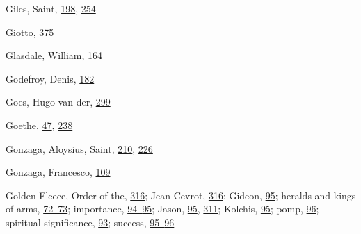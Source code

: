 Giles, Saint,
\protect\hyperlink{13_Chapter_Six__THE_DEPICTION_OF_TH.xhtmlux5cux23page_198}{198},
\protect\hyperlink{17_Chapter_Ten__THE_FAILURE_OF_IMAG.xhtmlux5cux23page_254}{254}

Giotto,
\protect\hyperlink{21_Chapter_Thirteen__IMAGE_AND_WORD.xhtmlux5cux23page_375}{375}

Glasdale, William,
\protect\hyperlink{12_Chapter_Five__THE_VISION_OF_DEAT.xhtmlux5cux23page_164}{164}

Godefroy, Denis,
\protect\hyperlink{13_Chapter_Six__THE_DEPICTION_OF_TH.xhtmlux5cux23page_182}{182}

Goes, Hugo van der,
\protect\hyperlink{20_ILLUSTRATIONS_FOLLOW_PAGE.xhtmlux5cux23page_299}{299}

Goethe,
\protect\hyperlink{09_Chapter_Two__THE_CRAVING_FOR_A_M.xhtmlux5cux23page_47}{47},
\protect\hyperlink{16_Chapter_Nine__THE_DECLINE_OF_SYM.xhtmlux5cux23page_238}{238}

Gonzaga, Aloysius, Saint,
\protect\hyperlink{14_Chapter_Seven__THE_PIOUS_PERSONA.xhtmlux5cux23page_210}{210},
\protect\hyperlink{15_Chapter_Eight__RELIGIOUS_EXCITAT.xhtmlux5cux23page_226}{226}

Gonzaga, Francesco,
\protect\hyperlink{10_Chapter_Three__THE_HEROIC_DREAM.xhtmlux5cux23page_109}{109}

Golden Fleece, Order of the,
\protect\hyperlink{20_ILLUSTRATIONS_FOLLOW_PAGE.xhtmlux5cux23page_316}{316};
Jean Cevrot,
\protect\hyperlink{20_ILLUSTRATIONS_FOLLOW_PAGE.xhtmlux5cux23page_316}{316};
Gideon,
\protect\hyperlink{10_Chapter_Three__THE_HEROIC_DREAM.xhtmlux5cux23page_95}{95};
heralds and kings of arms,
\protect\hyperlink{10_Chapter_Three__THE_HEROIC_DREAM.xhtmlux5cux23page_72}{72--}\protect\hyperlink{10_Chapter_Three__THE_HEROIC_DREAM.xhtmlux5cux23page_73}{73};
importance,
\protect\hyperlink{10_Chapter_Three__THE_HEROIC_DREAM.xhtmlux5cux23page_94}{94--}\protect\hyperlink{10_Chapter_Three__THE_HEROIC_DREAM.xhtmlux5cux23page_95}{95};
Jason,
\protect\hyperlink{10_Chapter_Three__THE_HEROIC_DREAM.xhtmlux5cux23page_95}{95},
\protect\hyperlink{20_ILLUSTRATIONS_FOLLOW_PAGE.xhtmlux5cux23page_311}{311};
Kolchis,
\protect\hyperlink{10_Chapter_Three__THE_HEROIC_DREAM.xhtmlux5cux23page_95}{95};
pomp,
\protect\hyperlink{10_Chapter_Three__THE_HEROIC_DREAM.xhtmlux5cux23page_96}{96};
spiritual significance,
\protect\hyperlink{10_Chapter_Three__THE_HEROIC_DREAM.xhtmlux5cux23page_93}{93};
success,
\protect\hyperlink{10_Chapter_Three__THE_HEROIC_DREAM.xhtmlux5cux23page_95}{95--}\protect\hyperlink{10_Chapter_Three__THE_HEROIC_DREAM.xhtmlux5cux23page_96}{96}

